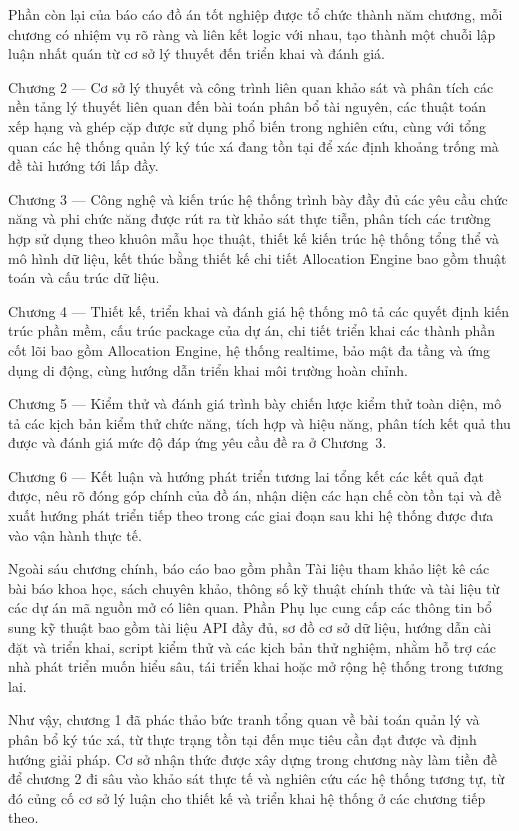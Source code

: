 ﻿\documentclass[a4paper,12pt,openany,oneside]{report}
\begin{document}
Phần còn lại của báo cáo đồ án tốt nghiệp được tổ chức thành năm chương, mỗi
chương có nhiệm vụ rõ ràng và liên kết logic với nhau, tạo thành một chuỗi lập
luận nhất quán từ cơ sở lý thuyết đến triển khai và đánh giá.

Chương 2 --- Cơ sở lý thuyết và công trình liên quan khảo sát và phân tích các
nền tảng lý thuyết liên quan đến bài toán phân bổ tài nguyên, các thuật toán
xếp hạng và ghép cặp được sử dụng phổ biến trong nghiên cứu, cùng với tổng
quan các hệ thống quản lý ký túc xá đang tồn tại để xác định khoảng trống mà
đề tài hướng tới lấp đầy.

Chương 3 --- Công nghệ và kiến trúc hệ thống trình bày đầy đủ các yêu cầu chức
năng và phi chức năng được rút ra từ khảo sát thực tiễn, phân tích các trường
hợp sử dụng theo khuôn mẫu học thuật, thiết kế kiến trúc hệ thống tổng thể và
mô hình dữ liệu, kết thúc bằng thiết kế chi tiết Allocation Engine bao gồm
thuật toán và cấu trúc dữ liệu.

Chương 4 --- Thiết kế, triển khai và đánh giá hệ thống mô tả các quyết định
kiến trúc phần mềm, cấu trúc package của dự án, chi tiết triển khai các thành
phần cốt lõi bao gồm Allocation Engine, hệ thống realtime, bảo mật đa tầng và
ứng dụng di động, cùng hướng dẫn triển khai môi trường hoàn chỉnh.

Chương 5 --- Kiểm thử và đánh giá trình bày chiến lược kiểm thử toàn diện, mô
tả các kịch bản kiểm thử chức năng, tích hợp và hiệu năng, phân tích kết quả
thu được và đánh giá mức độ đáp ứng yêu cầu đề ra ở Chương~3.

Chương 6 --- Kết luận và hướng phát triển tương lai tổng kết các kết quả đạt
được, nêu rõ đóng góp chính của đồ án, nhận diện các hạn chế còn tồn tại và
đề xuất hướng phát triển tiếp theo trong các giai đoạn sau khi hệ thống được
đưa vào vận hành thực tế.

Ngoài sáu chương chính, báo cáo bao gồm phần Tài liệu tham khảo liệt kê các
bài báo khoa học, sách chuyên khảo, thông số kỹ thuật chính thức và tài liệu
từ các dự án mã nguồn mở có liên quan. Phần Phụ lục cung cấp các thông tin bổ
sung kỹ thuật bao gồm tài liệu API đầy đủ, sơ đồ cơ sở dữ liệu, hướng dẫn cài
đặt và triển khai, script kiểm thử và các kịch bản thử nghiệm, nhằm hỗ trợ các
nhà phát triển muốn hiểu sâu, tái triển khai hoặc mở rộng hệ thống trong tương
lai.

Như vậy, chương 1 đã phác thảo bức tranh tổng quan về bài toán quản lý và phân
bổ ký túc xá, từ thực trạng tồn tại đến mục tiêu cần đạt được và định hướng
giải pháp. Cơ sở nhận thức được xây dựng trong chương này làm tiền đề để chương
2 đi sâu vào khảo sát thực tế và nghiên cứu các hệ thống tương tự, từ đó củng
cố cơ sở lý luận cho thiết kế và triển khai hệ thống ở các chương tiếp theo.
\end{document}
